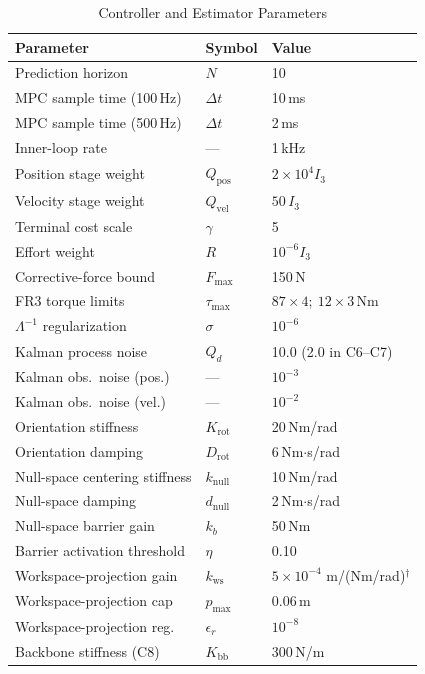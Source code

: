 \documentclass[journal]{IEEEtran}
\begin{document}
\begin{table}[!t]
\caption{Controller and Estimator Parameters}
\label{tab:params}
\renewcommand{\arraystretch}{1.0}
\footnotesize
\setlength{\tabcolsep}{3pt}
\begin{tabular}{p{2.3cm}p{1.2cm}p{2.5cm}}
\toprule
\textbf{Parameter} & \textbf{Symbol} & \textbf{Value}\\
\midrule
Prediction horizon & $N$ & 10\\
MPC sample time (100\,Hz) & $\Delta t$ & 10\,ms\\
MPC sample time (500\,Hz) & $\Delta t$ & 2\,ms\\
Inner-loop rate & --- & 1\,kHz\\
Position stage weight & $Q_\text{pos}$ & $2\times10^4 I_3$\\
Velocity stage weight & $Q_\text{vel}$ & $50\,I_3$\\
Terminal cost scale & $\gamma$ & 5\\
Effort weight & $R$ & $10^{-6}I_3$\\
Corrective-force bound & $F_\text{max}$ & 150\,N\\
FR3 torque limits & $\tau_\text{max}$ & $87\!\times\!4;\ 12\!\times\!3$\,Nm\\
$\Lambda^{-1}$ regularization & $\sigma$ & $10^{-6}$\\
Kalman process noise & $Q_d$ & 10.0 (2.0 in C6--C7)\\
Kalman obs.\ noise (pos.) & --- & $10^{-3}$\\
Kalman obs.\ noise (vel.) & --- & $10^{-2}$\\
Orientation stiffness & $K_\text{rot}$ & 20\,Nm/rad\\
Orientation damping & $D_\text{rot}$ & 6\,Nm$\cdot$s/rad\\
Null-space centering stiffness & $k_\text{null}$ & 10\,Nm/rad\\
Null-space damping & $d_\text{null}$ & 2\,Nm$\cdot$s/rad\\
Null-space barrier gain & $k_b$ & 50\,Nm\\
Barrier activation threshold & $\eta$ & 0.10\\
Workspace-projection gain & $k_\text{ws}$ & $5\times10^{-4}$ m/(Nm/rad)$^\dagger$\\
Workspace-projection cap & $p_\text{max}$ & 0.06\,m\\
Workspace-projection reg. & $\epsilon_r$ & $10^{-8}$\\
Backbone stiffness (C8) & $K_\text{bb}$ & 300\,N/m\\

\end{tabular}
\end{table}
\end{document}
